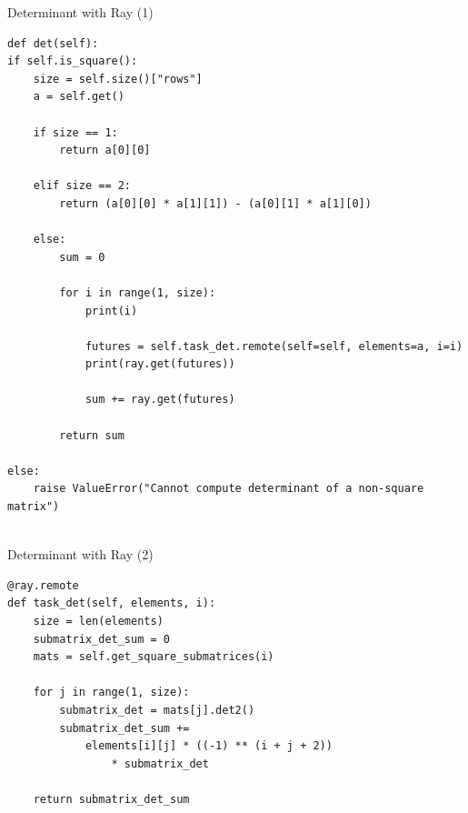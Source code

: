 \documentclass{beamer}
\begin{document}
\begin{frame}[fragile]{Determinant with Ray (1)}
    \begin{tiny}
        \begin{verbatim}
def det(self):
if self.is_square():
    size = self.size()["rows"]
    a = self.get()

    if size == 1:
        return a[0][0]

    elif size == 2:
        return (a[0][0] * a[1][1]) - (a[0][1] * a[1][0])

    else:
        sum = 0

        for i in range(1, size):
            print(i)

            futures = self.task_det.remote(self=self, elements=a, i=i)
            print(ray.get(futures))

            sum += ray.get(futures)

        return sum

else:
    raise ValueError("Cannot compute determinant of a non-square matrix")
        
            \end{verbatim}
    \end{tiny}
\end{frame}

\begin{frame}[fragile]{Determinant with Ray (2)}

    \begin{small}
        \begin{verbatim}
@ray.remote
def task_det(self, elements, i):
    size = len(elements)
    submatrix_det_sum = 0
    mats = self.get_square_submatrices(i)

    for j in range(1, size):
        submatrix_det = mats[j].det2()
        submatrix_det_sum += 
            elements[i][j] * ((-1) ** (i + j + 2)) 
                * submatrix_det

    return submatrix_det_sum
    \end{verbatim}
    \end{small}

\end{frame}
\end{document}
